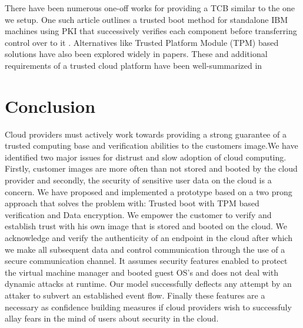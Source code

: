 \documentclass[10pt,twocolumn,pdftex]{article}
\begin{document}
There have been numerous one-off works for providing a TCB similar to the one we setup. One such article outlines a trusted boot method for standalone IBM machines using PKI that successively verifies each component before transferring control over to it \cite{Arbaugh:1997:SRB:882493.884371}. Alternatives like Trusted Platform Module (TPM) \cite{TCG} based solutions have also been explored widely in papers\cite{towards-trusted-cloud-computing, terra, semantic-remote, Garfinkel03flexibleos}.
These and additional requirements of a trusted cloud platform have been well-summarized in \cite{seeding-clouds-with-trust-anchors} 
\label{sec:related}

\section{Conclusion}
\label{sec:conclusion}
Cloud providers must actively work towards providing a strong guarantee of a trusted computing base and verification abilities to the customers image.We have identified two major issues for distrust and slow adoption of cloud computing. Firstly, customer images are more often than not stored and booted by the cloud provider and secondly, the security of sensitive user data on the cloud is a concern. We have proposed and implemented a prototype based on a two prong approach that solves the problem with: Trusted boot with TPM based verification and Data encryption. We empower the customer to verify and establish trust with his own image that is stored and booted on the cloud. We acknowledge and verify the authenticity of an endpoint in the cloud after which we make all subsequent data and control communication through the use of a secure communication channel.  It assumes security features enabled to protect the virtual machine manager and booted guest OS's and does not deal with dynamic attacks at runtime. Our model successfully deflects any attempt by an attaker to subvert an established event flow. Finally these features are a necessary as confidence building measures if cloud providers wish to successfuly allay fears in the mind of users about security in the cloud.
\nocite{*}
{}

\end{document}
